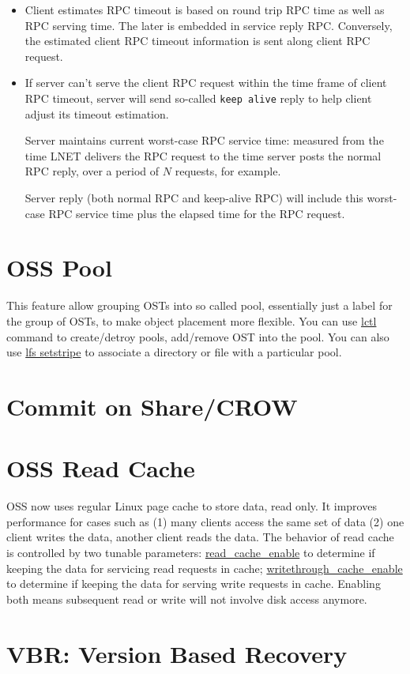 \documentclass{article}
\begin{document}
\begin{itemize}
  
  \item Client estimates RPC timeout is based on round trip RPC time as well
  as RPC serving time. The later is embedded in service reply RPC.
  Conversely, the estimated client RPC timeout information is sent along
  client RPC request.
  
  \item If server can't serve the client RPC request within the time frame of
  client RPC timeout, server will send so-called \texttt{keep alive} reply to
  help client adjust its timeout estimation.
  
  Server maintains current worst-case RPC service time: measured from the
  time LNET delivers the RPC request to the time server posts the normal RPC
  reply, over a period of $N$ requests, for example.
  
  Server reply (both normal RPC and keep-alive RPC) will include this
  worst-case RPC service time plus the elapsed time for the RPC request.
   
  
\end{itemize}


\section{OSS Pool}

This feature allow grouping OSTs into so called pool, essentially just a
label for the group of OSTs, to make object placement more flexible. You can
use \url{lctl} command to create/detroy pools, add/remove OST into the pool.
You can also use \url{lfs setstripe} to associate a directory or file with a
particular pool.


\section{Commit on Share/CROW}



\section{OSS Read Cache}

OSS now uses regular Linux page cache to store data, read only. It improves
performance for cases such as (1) many clients access the same set of data
(2) one client writes the data, another client reads the data. The behavior
of read cache is controlled by two tunable parameters:
\url{read_cache_enable} to determine if keeping the data for servicing read
requests in cache; \url{writethrough_cache_enable} to determine if keeping
the data for serving write requests in cache. Enabling both means subsequent
read or write will not involve disk access anymore.



\section{VBR: Version Based Recovery}
\end{document}
